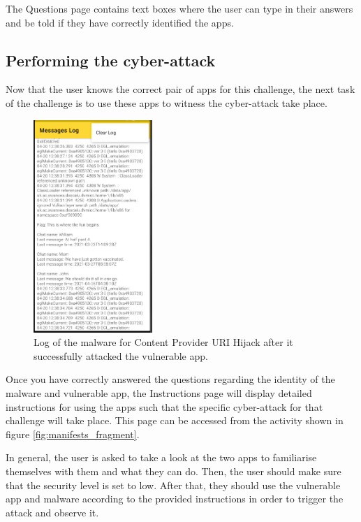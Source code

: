     The Questions page contains text boxes where the user can type in their answers and be told if they have correctly identified the apps.
    
    \subsection{Performing the cyber-attack}
        \label{subsec:perform_attack}
        
    Now that the user knows the correct pair of apps for this challenge, the next task of the challenge is to use these apps to witness the cyber-attack take place.
    
    \begin{figure}
        \centering
        \includegraphics[width=0.4\textwidth]{graphics/log.PNG}
        \caption{Log of the malware for Content Provider URI Hijack after it successfully attacked the vulnerable app.}
        \label{fig:malware_log}
    \end{figure}
    
    Once you have correctly answered the questions regarding the identity of the malware and vulnerable app, the Instructions page will display detailed instructions for using the apps such that the specific cyber-attack for that challenge will take place. This page can be accessed from the activity shown in figure \ref{fig:manifests_fragment}.
    
    In general, the user is asked to take a look at the two apps to familiarise themselves with them and what they can do. Then, the user should make sure that the security level is set to low. After that, they should use the vulnerable app and malware according to the provided instructions in order to trigger the attack and observe it. 
    
